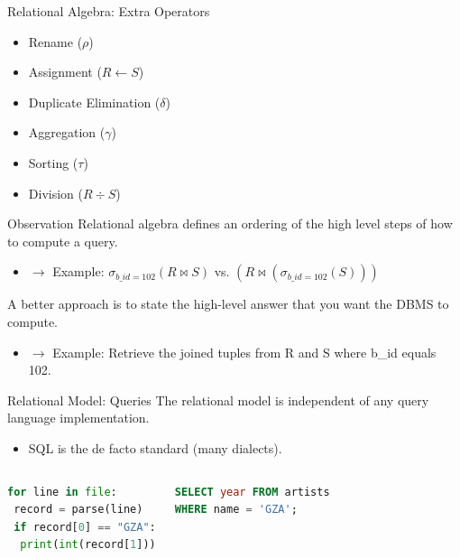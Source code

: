 \begin{frame}{Relational Algebra: Extra Operators}
    \begin{itemize}
        \item Rename ($\rho$)
        \item Assignment ($R \leftarrow S$)
        \item Duplicate Elimination ($\delta$)
        \item Aggregation ($\gamma$)
        \item Sorting ($\tau$)
        \item Division ($R \div S$)
    \end{itemize}
\end{frame}

\begin{frame}{Observation}
    Relational algebra defines an ordering of the high level steps of how to compute a query.
    \begin{itemize}
        \item $\rightarrow$ Example: $\sigma_{b\_id=102}(R \bowtie S)$ vs. $(R \bowtie (\sigma_{b\_id=102}(S)))$
    \end{itemize}
    \vspace{1em}
    A better approach is to state the high-level answer that you want the DBMS to compute.
    \begin{itemize}
        \item $\rightarrow$ Example: Retrieve the joined tuples from R and S where b\_id equals 102.
    \end{itemize}
\end{frame}

\begin{frame}[fragile]{Relational Model: Queries}
    The relational model is independent of any query language implementation.
    \begin{itemize}
        \item SQL is the de facto standard (many dialects).
    \end{itemize}
    \vspace{1em}
    \begin{columns}
        \begin{lstlisting}[language=Python]
for line in file:
 record = parse(line)
 if record[0] == "GZA":
  print(int(record[1]))
        \end{lstlisting}
        \begin{lstlisting}[language=SQL]
SELECT year FROM artists
WHERE name = 'GZA';
        \end{lstlisting}
    \end{columns}
\end{frame}

